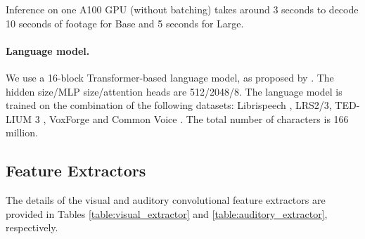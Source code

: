 \documentclass{article} \usepackage{iclr2023_conference,times}
\begin{document}
Inference on one A100 GPU (without batching) takes around 3 seconds to decode 10 seconds of footage for Base and 5 seconds for Large.

\paragraph{Language model.} We use a 16-block Transformer-based language model, as proposed by \citet{irie2019language}. The hidden size/MLP size/attention heads are 512/2048/8. The language model is trained on the combination of the following datasets: Librispeech \citep{panayotov2015librispeech}, LRS2/3, TED-LIUM 3 \citep{hernandez2018ted}, VoxForge and Common Voice \citep{ardila2019common}. The total number of characters is 166 million.

\subsection{Feature Extractors} \label{sec:feature_extractors}
The details of the visual and auditory convolutional feature extractors are provided in Tables \ref{table:visual_extractor} and \ref{table:auditory_extractor}, respectively.
\end{document}

